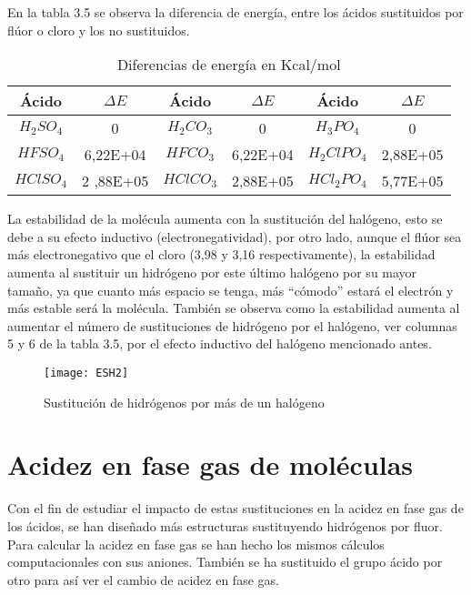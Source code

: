 En la tabla 3.5 se observa la diferencia de energía, entre los ácidos sustituidos por flúor o cloro y los no sustituidos.
\begin{table}[H]
	\centering
	\begin{tabular}{|c|c|c|c|c|c|}
		\hline
		Ácido	& $\Delta E$ &	Ácido	& $\Delta E$ & Ácido & $\Delta E$\\ \hline
		$ H_2SO_4$	& 0	& $H_2CO_3$	 & 0 &	$H_3PO_4$	& 0 \\ \hline
		$HFSO_4$ &	6,22E+04	& $HFCO_3$	& 6,22E+04	& $H_2ClPO_4$	& 2,88E+05 \\ \hline
		$HClSO_4$ &	2 ,88E+05	& $HClCO_3$ &	2,88E+05	& $HCl_2PO_4$ &	5,77E+05 \\ \hline
	\end{tabular}
	\caption{Diferencias de energía en Kcal/mol}
\end{table}

La estabilidad de la molécula aumenta con la sustitución del halógeno, esto se debe a su efecto inductivo (electronegatividad), por otro lado, aunque el flúor sea más electronegativo que el cloro (3,98 y 3,16 respectivamente), la estabilidad aumenta al sustituir un hidrógeno por este último halógeno por su mayor tamaño, ya que cuanto más espacio se tenga, más ``cómodo'' estará el electrón y más estable será la molécula.
También se observa como la estabilidad aumenta al aumentar el número de sustituciones de hidrógeno por el halógeno, ver columnas 5 y 6 de la tabla 3.5, por el efecto inductivo del halógeno mencionado antes.



\begin{figure}[h]
	\centering
	\texttt{[image: ESH2]}
	\caption{Sustitución de hidrógenos por más de un halógeno }
\end{figure}

\section{Acidez en fase gas de moléculas}

Con el fin de estudiar el impacto de estas sustituciones en la acidez en fase gas de los ácidos, se han diseñado más estructuras sustituyendo hidrógenos por fluor. Para calcular la acidez en fase gas se han hecho los mismos cálculos computacionales con sus aniones.
También se ha sustituido el grupo ácido por otro para así ver el cambio de acidez en fase gas.

